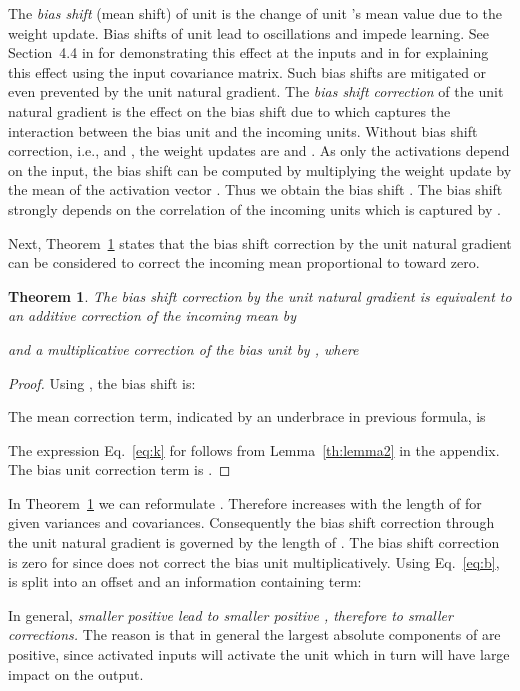 \documentclass{article}
\newtheorem{theorem}{Theorem}
\begin{document}
The {\em bias shift} (mean shift) of unit  is the change of unit 's
mean value due to the weight update. Bias shifts of unit 
lead to oscillations and impede learning. See Section~4.4 in \citet{LeCun:98} for
demonstrating this effect at the inputs and in \citet{LeCun:91} for explaining
this effect using the input covariance matrix.
Such bias shifts are mitigated or even prevented
by the unit natural gradient.
The {\em bias shift correction} of the unit natural gradient is the
effect on the bias shift due to  which captures
the interaction between the bias unit and the incoming units.
Without bias shift correction, i.e.,  and ,
the weight updates are  and .
As only the activations
depend on the input, the bias shift can be computed by multiplying the weight
update by the mean of the activation vector .
Thus we obtain the bias shift
.
The bias shift strongly depends on the correlation of the incoming
units which is captured by .

Next, Theorem~\ref{th:th2} states that the bias shift correction by the
unit natural gradient can be
considered to correct the incoming mean  proportional
to  toward zero.
\begin{theorem}
\label{th:th2}
The bias shift correction by the unit natural gradient is equivalent to
an additive correction of the incoming mean by

and a multiplicative correction of the bias unit by , where

\end{theorem}
\begin{proof}
Using
, the bias shift is:


The mean correction term, indicated by an underbrace in previous
formula, is

The expression Eq.~\eqref{eq:k} for  follows from
Lemma~\ref{th:lemma2} in the appendix.
The bias unit correction term is
.
\end{proof}


In Theorem~\ref{th:th2} we can reformulate
. Therefore  increases with the length of
 for given variances and covariances.
Consequently the bias shift correction through the
unit natural gradient is governed by the length of .
The bias shift correction is zero for  since
 does not correct the bias unit multiplicatively.
Using Eq.~\eqref{eq:b},  is split into an
offset and an information containing term:

In general, {\em smaller positive  lead to smaller
positive , therefore to smaller corrections.}
The reason is that in general the largest absolute components
of  are positive,
since activated inputs will activate the unit  which in turn will have
large impact on the output.
\end{document}
